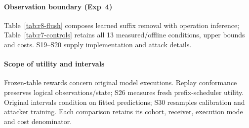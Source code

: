 \paragraph{Observation boundary (Exp~4)}
Table~\ref{tab:r8-flush} composes learned suffix removal with operation inference; Table~\ref{tab:r7-controls} retains all 13 measured/offline conditions, upper bounds and costs. S19--S20 supply implementation and attack details.



\paragraph{Scope of utility and intervals}\label{sec:validity}
Frozen-table rewards concern original model executions. Replay conformance preserves logical observations/state; S26 measures fresh prefix-scheduler utility. Original intervals condition on fitted predictions; S30 resamples calibration and attacker training. Each comparison retains its cohort, receiver, execution mode and cost denominator.
\endgroup
